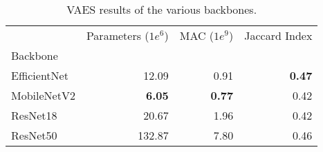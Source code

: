 \begin{table}[ht]
    \centering
    \caption{VAES results of the various backbones.}
    \label{tab:vaes-backbones-results}
    \begin{tabular}{lrrr}
        \toprule
                     & Parameters ($1e^6$) & MAC ($1e^9$)  & Jaccard Index \\
        Backbone     &                     &               &               \\
        \midrule
        EfficientNet & 12.09               & 0.91          & \textbf{0.47} \\
        MobileNetV2  & \textbf{6.05}       & \textbf{0.77} & 0.42          \\
        ResNet18     & 20.67               & 1.96          & 0.42          \\
        ResNet50     & 132.87              & 7.80          & 0.46          \\
        \bottomrule
    \end{tabular}
\end{table}
